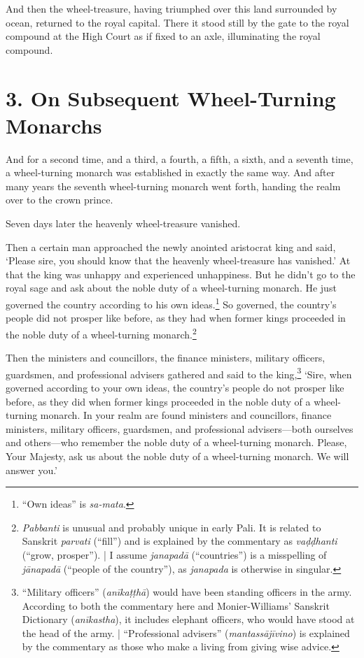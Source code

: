 \documentclass[12pt,openany]{book}%
\begin{document}
And then the wheel-treasure, having triumphed over this land surrounded by ocean, returned to the royal capital. There it stood still by the gate to the royal compound at the High Court as if fixed to an axle, illuminating the royal compound. 

\section*{3. On Subsequent Wheel-Turning Monarchs }

And for a second time, and a third, a fourth, a fifth, a sixth, and a seventh time, a wheel-turning monarch was established in exactly the same way. And after many years the seventh wheel-turning monarch went forth, handing the realm over to the crown prince. 

Seven days later the heavenly wheel-treasure vanished. 

Then a certain man approached the newly anointed aristocrat king and said, ‘Please sire, you should know that the heavenly wheel-treasure has vanished.’ At that the king was unhappy and experienced unhappiness. But he didn’t go to the royal sage and ask about the noble duty of a wheel-turning monarch. He just governed the country according to his own ideas.\footnote{“Own ideas” is \textit{sa-mata}. } So governed, the country’s people did not prosper like before, as they had when former kings proceeded in the noble duty of a wheel-turning monarch.\footnote{\textit{Pabbanti} is unusual and probably unique in early Pali. It is related to Sanskrit \textit{parvati} (“fill”) and is explained by the commentary as \textit{\textsanskrit{vaḍḍhanti}} (“grow, prosper”). | I assume \textit{\textsanskrit{janapadā}} (“countries”) is a misspelling of \textit{\textsanskrit{jānapadā}} (“people of the country”), as \textit{janapada} is otherwise in singular. } 

Then the ministers and councillors, the finance ministers, military officers, guardsmen, and professional advisers gathered and said to the king,\footnote{“Military officers” (\textit{\textsanskrit{anīkaṭṭhā}}) would have been standing officers in the army. According to both the commentary here and Monier-Williams’ Sanskrit Dictionary (\textit{\textsanskrit{anīkastha}}), it includes elephant officers, who would have stood at the head of the army. | “Professional advisers” (\textit{\textsanskrit{mantassājīvino}}) is explained by the commentary as those who make a living from giving wise advice. } ‘Sire, when governed according to your own ideas, the country’s people do not prosper like before, as they did when former kings proceeded in the noble duty of a wheel-turning monarch. In your realm are found ministers and councillors, finance ministers, military officers, guardsmen, and professional advisers—both ourselves and others—who remember the noble duty of a wheel-turning monarch. Please, Your Majesty, ask us about the noble duty of a wheel-turning monarch. We will answer you.’ 
\end{document}
